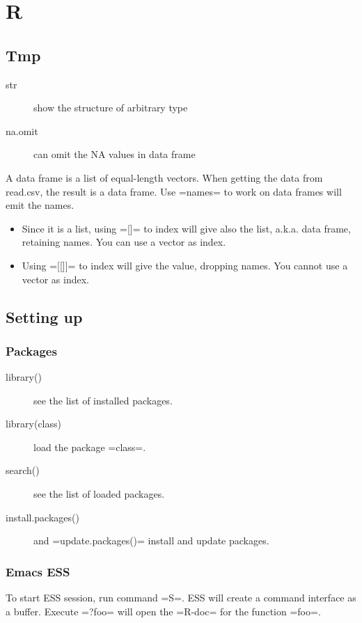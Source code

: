 \section{R}



\subsection{Tmp}
\begin{description}
\item [str] show the structure of arbitrary type
\item [na.omit] can omit the NA values in data frame
\end{description}

A data frame is a list of equal-length vectors.  When getting the data
from read.csv, the result is a data frame.  Use =names= to work on
data frames will emit the names.
\begin{itemize}
\item Since it is a list, using =[]= to index will give also the list,
  a.k.a. data frame, retaining names.  You can use a vector as index.
\item Using =[[]]= to index will give the value, dropping names.  You
  cannot use a vector as index.
\end{itemize}

\subsection{Setting up}

\subsubsection{Packages}
\begin{description}
\item [library()] see the list of installed packages.
\item [library(class)] load the package =class=.
\item [search()] see the list of loaded packages.
\item [install.packages()] and =update.packages()= install and update packages.
\end{description}

\subsubsection{Emacs ESS}
To start ESS session, run command =S=.  ESS will create a command
interface as a buffer.  Execute =?foo= will open the =R-doc= for the
function =foo=.

